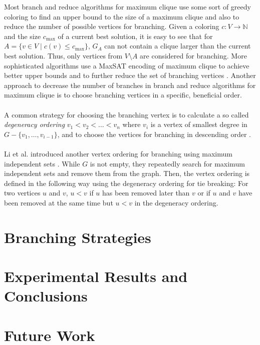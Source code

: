 \documentclass[]{article}
\begin{document}
Most branch and reduce algorithms for maximum clique use some sort of greedy coloring to find an upper bound to the size of a maximum clique and also to reduce the number of possible vertices for branching. Given a coloring $c:V \rightarrow \mathbb{N}$ and the size $c_\text{max}$ of a current best solution, it is easy to see that for $A = \{v\in V \;|\; c(v)\leq c_\text{max}\}$, $G_A$ can not contain a clique larger than the current best solution. Thus, only vertices from $V\setminus A$ are considered for branching. More sophisticated algorithms use a MaxSAT encoding of maximum clique to achieve better upper bounds and to further reduce the set of branching vertices \cite{LiJiang,LiFangXu}. Another approach to decrease the number of branches in branch and reduce algorithms for maximum clique is to choose branching vertices in a specific, beneficial order. \paragraph{}
A common strategy for choosing the branching vertex is to calculate a so called \textit{degeneracy ordering} $v_1 < v_2 < \dots < v_n$ where $v_i$ is a vertex of smallest degree in $G - \{v_1, \dots, v_{i-1} \}$, and to choose the vertices for branching in descending order \cite{CarraghanPardalos}.\paragraph{}
Li et al. introduced another vertex ordering for branching using maximum independent sets \cite{LiFangXu}. While $G$ is not empty, they repeatedly search for maximum independent sets and remove them from the graph. Then, the vertex ordering is defined in the following way using the degeneracy ordering for tie breaking: For two vertices $u$ and $v$, $u < v$ if $u$ has been removed later than $v$ or if $u$ and $v$ have been removed at the same time but $u < v$ in the degeneracy ordering. 

\newpage
\section{Branching Strategies} \label{sec4}
\section{Experimental Results and Conclusions} \label{sec5}
\section{Future Work} \label{sec6}
\newpage




\end{document}
